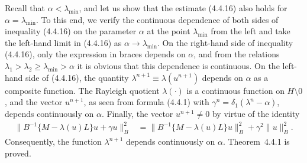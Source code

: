 \documentclass[11pt,oneside]{book}
\begin{document}
Recall that $\alpha < \lambda_{\min}$, and let us show that the estimate (4.4.16) also holds for $\alpha = \lambda_{\min}$. To this end, we verify the continuous dependence of both sides of inequality (4.4.16) on the parameter $\alpha$ at the point $\lambda_{\min}$ from the left and take the left-hand limit in (4.4.16) as $\alpha \to \lambda_{\min}$. On the right-hand side of inequality (4.4.16), only the expression in braces depends on $\alpha$, and from the relations $\lambda_1 > \lambda_2 \geqslant \lambda_{\min} > \alpha$ it is obvious that this dependence is continuous. On the left-hand side of (4.4.16), the quantity $\lambda^{n+1} \equiv \lambda(u^{n+1})$ depends on $\alpha$ as a composite function. The Rayleigh quotient $\lambda(\cdot)$ is a continuous function on $H \setminus 0$, and the vector $u^{n+1}$, as seen from formula (4.4.1) with $\gamma^n = \delta_1(\lambda^n - \alpha)$, depends continuously on $\alpha$. Finally, the vector $u^{n+1} \neq 0$ by virtue of the identity
\[
\begin{aligned}
\bigl\|B^{-1}\{M - \lambda(u)L\}u + \gamma u\bigr\|_B^2
&= \bigl\|B^{-1}\{M - \lambda(u)L\}u\bigr\|_B^2 + \gamma^2 \|u\|_B^2.
\end{aligned} \tag{4.4.17}
\]
Consequently, the function $\lambda^{n+1}$ depends continuously on $\alpha$. Theorem~4.4.1 is proved.
\end{document}
